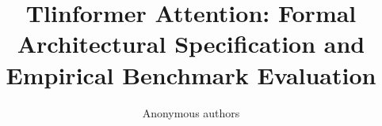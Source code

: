 \title{\textbf{Tlinformer Attention: Formal Architectural Specification and Empirical Benchmark Evaluation}}

\author{Anonymous authors}
